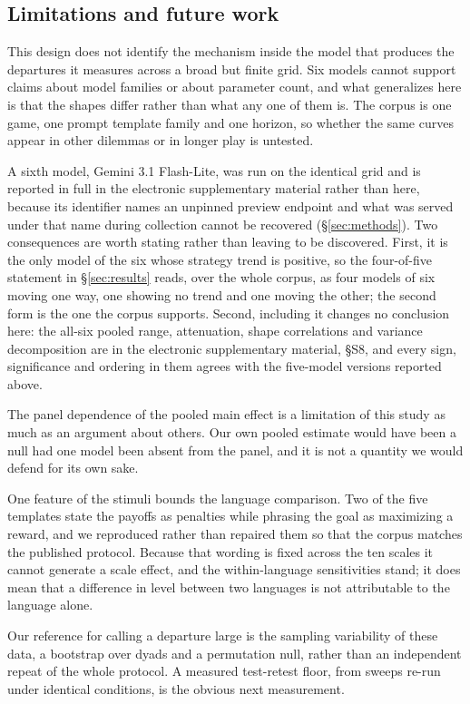 \documentclass[11pt,a4paper]{article}
\begin{document}
\subsection{Limitations and future work}

This design does not identify the mechanism inside the model that produces the
departures it measures across a broad but finite grid. Six models cannot
support claims about model families or about parameter
count, and what generalizes here is that the shapes differ rather than what any
one of them is. The corpus is one game, one prompt template family and one
horizon, so whether the same curves appear in other dilemmas or in longer play
is untested.

A sixth model, Gemini 3.1 Flash-Lite, was run on the identical grid and is
reported in full in the electronic supplementary material rather than here,
because its identifier names an unpinned preview endpoint and what was served
under that name during collection cannot be recovered
(\S\ref{sec:methods}). Two consequences are worth stating rather than leaving to
be discovered. First, it is the only model of the six whose strategy trend is
positive, so the four-of-five statement in \S\ref{sec:results} reads, over the
whole corpus, as four models of six moving one way, one showing no trend and one
moving the other; the second form is the one the corpus supports. Second,
including it changes no conclusion here: the all-six pooled range, attenuation,
shape correlations and variance decomposition are in the electronic
supplementary material, \S S8, and every sign, significance and ordering in them
agrees with the five-model versions reported above.

The panel dependence of the pooled main effect is a limitation of this study as
much as an argument about others. Our own pooled estimate would have been a null
had one model been absent from the panel, and it is not a quantity we would
defend for its own sake.

One feature of the stimuli bounds the language comparison. Two of the five
templates state the payoffs as penalties while phrasing the goal as maximizing a
reward, and we reproduced rather than repaired them so that the corpus matches
the published protocol. Because that wording is fixed across the ten scales it
cannot generate a scale effect, and the within-language sensitivities stand; it
does mean that a difference in level between two languages is not attributable
to the language alone.

Our reference for calling a departure large is the sampling variability of these
data, a bootstrap over dyads and a permutation null, rather than an independent
repeat of the whole protocol. A measured test-retest floor, from
sweeps re-run under identical conditions, is the obvious next measurement.
\end{document}
